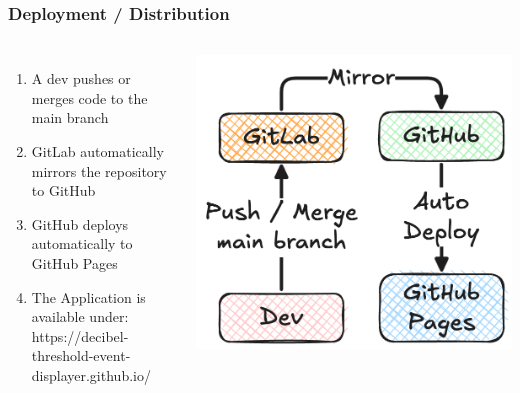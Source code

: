 \begin{frame}
    \frametitle{Deployment / Distribution}
    \begin{columns}
            \begin{enumerate}
                \large
                \item A dev pushes or merges code to the main branch
                \item GitLab automatically mirrors the repository to GitHub
                \item GitHub deploys automatically to GitHub Pages
                \item The Application is available under: \\
                      https://decibel-threshold-event-displayer.github.io/
            \end{enumerate}
            \centering
            \includegraphics[width=1\linewidth]{../assets/deployment_and_distribution.png}
    \end{columns}
\end{frame}
